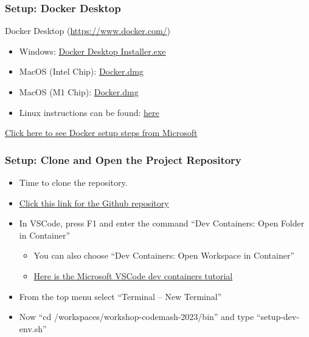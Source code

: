 \documentclass[aspectratio=169]{beamer}
\begin{document}
\begin{frame}
	\frametitle{Setup: Docker Desktop}
	Docker Desktop (\href{https://www.docker.com/}{https://www.docker.com/})

	\begin{itemize}
		\item Windows: \href{https://prereqs.codemash.org/Files/Docker\%20Desktop\%20Installer.exe}{Docker Desktop Installer.exe}
		\item MacOS (Intel Chip): \href{https://prereqs.codemash.org/Files/Docker.dmg}{Docker.dmg}
		\item MacOS (M1 Chip): \href{https://prereqs.codemash.org/Files/Chip/Docker.dmg}{Docker.dmg}
		\item Linux instructions can be found: \href{https://docs.docker.com/desktop/install/linux-install/}{here}
	\end{itemize}
	\vspace{2mm}

	\href{https://code.visualstudio.com/docs/devcontainers/containers\#\_installation}{Click here to see Docker setup steps from Microsoft}
\end{frame}

\begin{frame}
	\frametitle{Setup: Clone and Open the Project Repository}
	\begin{itemize}
		\item Time to clone the repository.
		\item \href{https://github.com/devsecfranklin/workshop-codemash-2023}{Click this link for the Github repository}
		\item In VSCode, press F1 and enter the command ``Dev Containers: Open Folder in Container''
		      \begin{itemize}
			      \item You can also choose ``Dev Containers: Open Workspace in Container''
			      \item \href{https://code.visualstudio.com/docs/devcontainers/tutorial}{Here is the Microsoft VSCode dev containers tutorial}
		      \end{itemize}
		\item From the top menu select ``Terminal -- New Terminal''
		\item Now ``cd /workspaces/workshop-codemash-2023/bin'' and type ``setup-dev-env.sh''
	\end{itemize}
	\vspace{2mm}
\end{frame}
\end{document}
